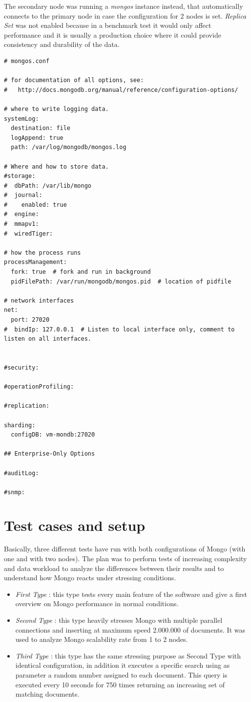 \newpage
The secondary node was running a \textit{mongos} instance instead, that automatically connects to the primary node in case the configuration for 2 nodes is set. \textit{Replica Set} was not enabled because in a benchmark test it would only affect performance and it is usually a production choice where it could provide consistency and durability of the data.

\begin{lstlisting}
# mongos.conf

# for documentation of all options, see:
#   http://docs.mongodb.org/manual/reference/configuration-options/

# where to write logging data.
systemLog:
  destination: file
  logAppend: true
  path: /var/log/mongodb/mongos.log

# Where and how to store data.
#storage:
#  dbPath: /var/lib/mongo
#  journal:
#    enabled: true
#  engine:
#  mmapv1:
#  wiredTiger:

# how the process runs
processManagement:
  fork: true  # fork and run in background
  pidFilePath: /var/run/mongodb/mongos.pid  # location of pidfile

# network interfaces
net:
  port: 27020
#  bindIp: 127.0.0.1  # Listen to local interface only, comment to listen on all interfaces.


#security:

#operationProfiling:

#replication:

sharding:
  configDB: vm-mondb:27020

## Enterprise-Only Options

#auditLog:

#snmp:
\end{lstlisting}

 
\section{Test cases and setup}
\label{sec:2}
Basically, three different tests have run with both configurations of Mongo (with one and with two nodes). 
The plan was to perform tests of increasing complexity and data workload to analyze the differences between their results and to  understand how Mongo reacts under stressing conditions.
\begin{itemize}
	\item \textit{First Type} : this type tests every main feature of the software and  give a first overview on Mongo performance in normal conditions.
	\item \textit{Second Type} : this type heavily stresses Mongo with multiple parallel connections and inserting at maximum speed 2.000.000 of documents. It was used to analyze Mongo scalability rate from 1 to 2 nodes.
	\item \textit{Third Type} : this type has the same stressing purpose as Second Type with identical configuration, in addition it executes a specific search using as parameter a random number assigned to each document. This query is executed every 10 seconds for 750 times returning an increasing set of matching documents.
\end{itemize}


